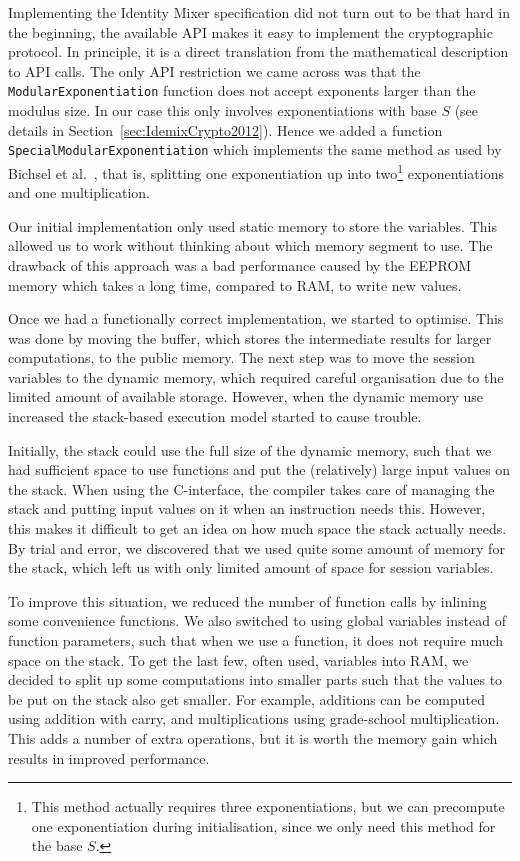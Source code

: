Implementing the Identity Mixer specification did not turn out to be that hard
in the beginning, the available API makes it easy to implement the cryptographic
protocol. In principle, it is a direct translation from the mathematical
description to API calls. The only API restriction we came across was that the
\texttt{ModularExponentiation} function does not accept exponents larger than
the modulus size. In our case this only involves exponentiations with base $S$
(see details in Section~\ref{sec:IdemixCrypto2012}). Hence we added a function
\texttt{SpecialModularExponentiation} which implements the same method as used
by Bichsel et al.~\cite{BichselCGS2009}, that is, splitting one exponentiation
up into two\footnote{This method actually requires three exponentiations, but
we can precompute one exponentiation during initialisation, since we only need
this method for the base $S$.} exponentiations and one multiplication.

Our initial implementation only used static memory to store the variables. This
allowed us to work without thinking about which memory segment to use. The
drawback of this approach was a bad performance caused by the EEPROM memory
which takes a long time, compared to RAM, to write new values.

Once we had a functionally correct implementation, we started to optimise. This
was done by moving the buffer, which stores the intermediate results for larger
computations, to the public memory. The next step was to move the session
variables to the dynamic memory, which required careful organisation due to the
limited amount of available storage. However, when the dynamic memory use
increased the stack-based execution model started to cause trouble.

Initially, the stack could use the full size of the dynamic memory, such that
we had sufficient space to use functions and put the (relatively) large input
values on the stack. When using the C-interface, the compiler takes care of
managing the stack and putting input values on it when an instruction needs
this. However, this makes it difficult to get an idea on how much space the
stack actually needs. By trial and error, we discovered that we used quite some
amount of memory for the stack, which left us with only limited amount of space
for session variables.

To improve this situation, we reduced the number of function calls by inlining
some convenience functions. We also switched to using global variables instead
of function parameters, such that when we use a function, it does not require
much space on the stack. To get the last few, often used, variables into RAM,
we decided to split up some computations into smaller parts such that the
values to be put on the stack also get smaller. For example, additions can be
computed using addition with carry, and multiplications using grade-school
multiplication. This adds a number of extra operations, but it is worth the
memory gain which results in improved performance.

